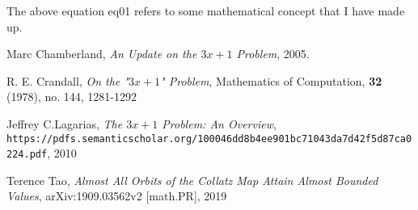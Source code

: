 \documentclass[12pt, a4paper, reqno]{amsart}
\begin{document}
The above equation eq01 refers to some mathematical concept that
I have made up.






\begin{thebibliography}{4}

 Marc Chamberland, \textit{An Update on the $3x+1$ Problem},
    2005.

 R. E. Crandall, \textit{On the "$3x+1$" Problem}, 
    Mathematics of Computation, \textbf{32} (1978), no. 144, 1281-1292

 Jeffrey C.Lagarias, \textit{The $3x+1$ Problem: An Overview},
    \\\texttt{https://pdfs.semanticscholar.org/100046dd8b4ee901bc71043da7d42f5d87ca0224.pdf}, 
    2010

 Terence Tao, \textit{Almost All Orbits of the Collatz Map Attain 
    Almost Bounded Values}, arXiv:1909.03562v2 [math.PR], 2019
        
\end{thebibliography}
\end{document}
